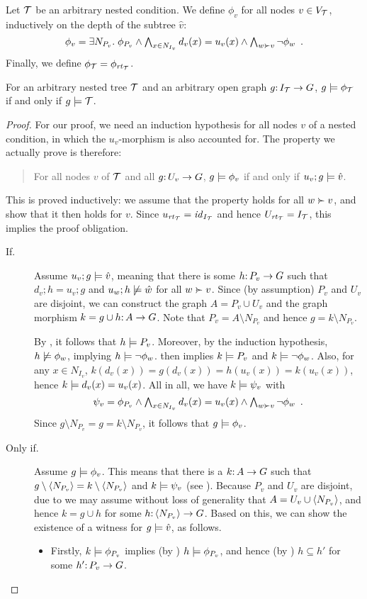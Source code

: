 Let ${\mathcal{T}}$ be an arbitrary nested condition. We define $\phi_v$ for all nodes $v\in V_{\mathcal{T}}$, inductively on the depth of the subtree $\hat v$:
%
\[ \phi_v = \textstyle \exists N_{P_v}\st \phi_{P_v}\wedge \bigwedge_{x\in N_{I_v}} d_v(x)=u_v(x) \wedge \bigwedge_{w\childof v} \neg\phi_w \enspace. \]
%
Finally, we define $\phi_{\mathcal{T}}=\phi_{\mathit{rt}_{{\mathcal{T}}}}$.
%
\begin{theorem}
For an arbitrary nested tree ${\mathcal{T}}$ and an arbitrary open graph $g{:}\, I_{\mathcal{T}}\rightarrow G$, $g\models\phi_{\mathcal{T}}$ if and only if $g\models{\mathcal{T}}$.
\end{theorem}
%
\begin{proof}
For our proof, we need an induction hypothesis for all nodes $v$ of a nested condition, in which the $u_v$-morphism is also accounted for. The property we actually prove is therefore:
\begin{quote}
For all nodes $v$ of ${\mathcal{T}}$ and all $g{:}\, U_v\rightarrow G$, $g\models \phi_v$ if and only if $u_v;g\models \hat v$.
\end{quote}
This is proved inductively: we assume that the property holds for all $w\childof v$, and show that it then holds for $v$. Since $u_{\mathit{rt}_{{\mathcal{T}}}}={\mathit{id}}_{I_{\mathcal{T}}}$ and hence $U_{\mathit{rt}_{{\mathcal{T}}}}=I_{\mathcal{T}}$, this implies the proof obligation.
%
\begin{description}
\item[If.] Assume $u_v;g\models \hat v$, meaning that there is some $h{:}\, P_v\rightarrow G$ such that $d_v;h=u_v;g$ and $u_w;h\not\models \hat w$ for all $w\childof v$. Since (by assumption) $P_v$ and $U_v$ are disjoint, we can construct the graph $A=P_v\cup U_v$ and the graph morphism $k=g\cup h{:}\, A\rightarrow G$. Note that $P_v=A\setminus N_{P_v}$ and hence $g=k\setminus N_{P_v}$.

By , it follows that $h\models P_v$. Moreover, by the induction hypothesis, $h\not\models \phi_w$, implying $h\models\neg \phi_w$.  then implies $k\models P_v$ and $k\models \neg\phi_w$. Also, for any $x\in N_{I_v}$, $k(d_v(x))=g(d_v(x))=h(u_v(x))=k(u_v(x))$, hence $k\models d_v(x)=u_v(x)$. All in all, we have $k\models \psi_v$ with
%
\begin{equation}\label{eq:k}
\psi_v = \textstyle \phi_{P_v}\wedge \bigwedge_{x\in N_{I_v}} d_v(x)=u_v(x) \wedge \bigwedge_{w\childof v} \neg\phi_w \enspace.
\end{equation}
%
Since $g\setminus N_{P_v}=g=k\setminus N_{P_v}$, it follows that $g\models \phi_v$.

\item[Only if.] Assume $g\models \phi_v$. This means that there is a $k{:}\, A\rightarrow G$ such that $g\setminus \langle N_{P_v}\rangle=k\setminus \langle N_{P_v}\rangle$ and $k\models \psi_v$ (see ). Because $P_v$ and $U_v$ are disjoint, due to  we may assume without loss of generality that $A= U_v\cup\langle N_{P_v}\rangle$, and hence $k=g\cup h$ for some $h{:}\, \langle N_{P_v}\rangle\rightarrow G$. Based on this, we can show the existence of a witness for $g\models \hat v$, as follows.
\begin{itemize}
\item Firstly, $k\models \phi_{P_v}$ implies (by ) $h\models \phi_{P_v}$, and hence (by ) $h\subseteq h'$ for some $h'{:}\, P_v\rightarrow G$.


\end{itemize}
\end{description}
\end{proof}
